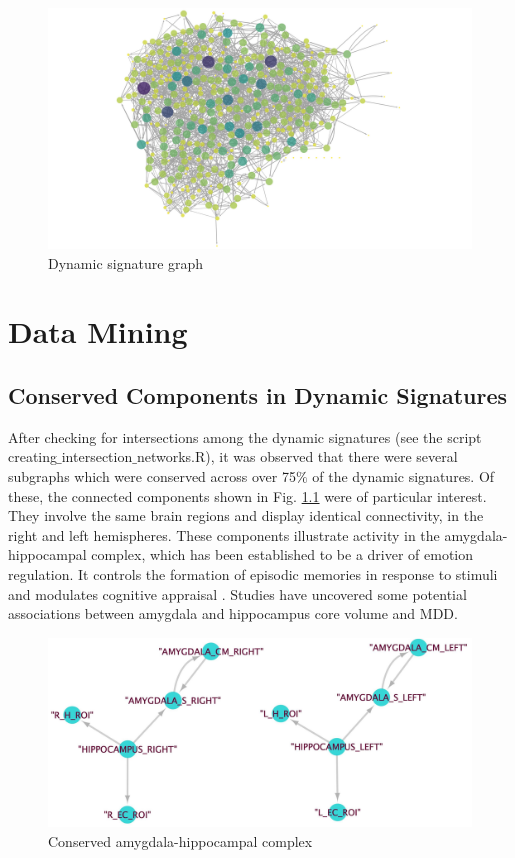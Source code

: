 \documentclass[12pt]{report}
\begin{document}
		\begin{figure}[H]
			\centering
			\includegraphics[scale=0.075]{Images/S0197BMS2INCLRcompletecorr_DynSig_k4.jpeg}
			\caption{Dynamic signature graph}
			\label{networkgraph}
		\end{figure}
		
	\chapter{Data Mining}
		\section{Conserved Components in Dynamic Signatures}
		After checking for intersections among the dynamic signatures (see the script creating$\_$intersection$\_$networks.R), it was observed that there were several subgraphs which were conserved across over 75$\%$ of the dynamic signatures. Of these, the connected components shown in Fig. \ref{amygdalahippocampuscomponent} were of particular interest. They involve the same brain regions and display identical connectivity, in the right and left hemispheres. These components illustrate activity in the amygdala-hippocampal complex, which has been established to be a driver of emotion regulation. It controls the formation of episodic memories in response to stimuli and modulates cognitive appraisal \cite{phelps2004human}. Studies have uncovered some potential associations between amygdala \cite{Hamilton2008} and hippocampus \cite{Anand2017} core volume and MDD.

			\begin{figure}[H]
				\centering
			\includegraphics[scale=0.1]{Images/conserved_amygdala_hippocampal_complex.jpeg}
			\caption{Conserved amygdala-hippocampal complex}
			\label{amygdalahippocampuscomponent}
			\end{figure}
		
\end{document}

